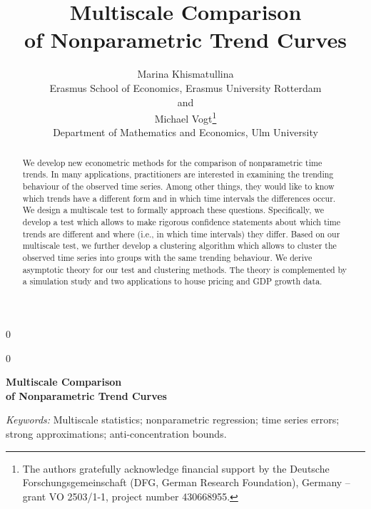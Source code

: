 \documentclass[12pt]{article}
\newcommand{\blind}{0}
\begin{document}
\def\spacingset#1{\renewcommand{\baselinestretch}%
{#1}\small\normalsize} \spacingset{1}

\blind
{
  \title{\bf Multiscale Comparison \\[0.1cm] of Nonparametric Trend Curves}
  \author{Marina Khismatullina\\ Erasmus School of Economics, Erasmus University Rotterdam\\
  and \\
  Michael Vogt\thanks{
  The authors gratefully acknowledge financial support by the Deutsche Forschungsgemeinschaft 
  (DFG, German Research Foundation), Germany – grant VO 2503/1-1, project number 430668955.}
  \hspace{.2cm}\\
  Department of Mathematics and Economics, Ulm University}
  \maketitle
} \fi

\blind
{
  \bigskip
  \bigskip
  \bigskip
  \begin{center}
    {\LARGE\bf Multiscale Comparison \\[0.3cm] of Nonparametric Trend Curves}
\end{center}
  \medskip
} \fi

\bigskip
\begin{abstract}
{\noindent We develop new econometric methods for the comparison of nonparametric time trends. In many applications, practitioners are interested in examining the trending behaviour of the observed time series. Among other things, they would like to know which trends have a different form and in which time intervals the differences occur. We design a multiscale test to formally approach these questions. Specifically, we develop a test which allows to make rigorous confidence statements about which time trends are different and where (i.e., in which time intervals) they differ. Based on our multiscale test, we further develop a clustering algorithm which allows to cluster the observed time series into groups with the same trending behaviour. We derive asymptotic theory for our test and clustering methods. The theory is complemented by a simulation study and two applications to house pricing and GDP growth data.}
\end{abstract}

\noindent%
{\it Keywords:} Multiscale statistics; nonparametric regression; time series errors; strong approximations; anti-concentration bounds.
\vfill
\end{document}
